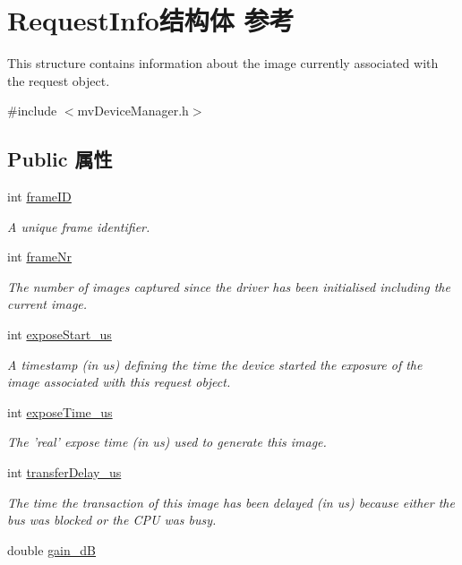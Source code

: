 \hypertarget{struct_request_info}{\section{Request\+Info结构体 参考}
\label{struct_request_info}
}


This structure contains information about the image currently associated with the request object.  




{\ttfamily \#include $<$mv\+Device\+Manager.\+h$>$}

\subsection*{Public 属性}
\begin{DoxyCompactItemize}
\item 
int \hyperlink{struct_request_info_a7df4309a78b37b5afd9dd3f942e7f09e}{frame\+I\+D}
\begin{DoxyCompactList}\small\item\em A unique frame identifier. \end{DoxyCompactList}\item 
\hypertarget{struct_request_info_a3164eff329433c24598e473dea05cfa8}{int \hyperlink{struct_request_info_a3164eff329433c24598e473dea05cfa8}{frame\+Nr}}\label{struct_request_info_a3164eff329433c24598e473dea05cfa8}

\begin{DoxyCompactList}\small\item\em The number of images captured since the driver has been initialised including the current image. \end{DoxyCompactList}\item 
int \hyperlink{struct_request_info_a448cb9b558f66a42a3f3231379d5750d}{expose\+Start\+\_\+us}
\begin{DoxyCompactList}\small\item\em A timestamp (in us) defining the time the device started the exposure of the image associated with this request object. \end{DoxyCompactList}\item 
int \hyperlink{struct_request_info_a7e79697a4d66237fce3ce7fd077b92e1}{expose\+Time\+\_\+us}
\begin{DoxyCompactList}\small\item\em The 'real' expose time (in us) used to generate this image. \end{DoxyCompactList}\item 
int \hyperlink{struct_request_info_afcc4a35d0065f27e5ab6d90a4499e354}{transfer\+Delay\+\_\+us}
\begin{DoxyCompactList}\small\item\em The time the transaction of this image has been delayed (in us) because either the bus was blocked or the C\+P\+U was busy. \end{DoxyCompactList}\item 
\hypertarget{struct_request_info_aa865467fea3f9c9246cab38ca1d2ac9e}{double \hyperlink{struct_request_info_aa865467fea3f9c9246cab38ca1d2ac9e}{gain\+\_\+d\+B}}\label{struct_request_info_aa865467fea3f9c9246cab38ca1d2ac9e}


\end{DoxyCompactItemize}
